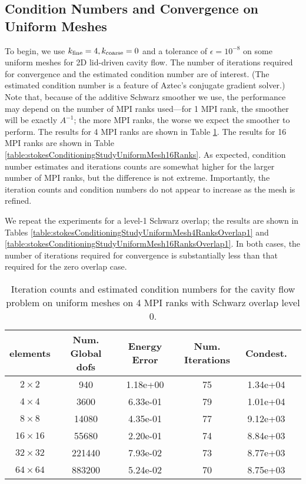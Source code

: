 \documentclass[11pt]{amsart}
\begin{document}
\subsection{Condition Numbers and Convergence on Uniform Meshes}
\label{sec:convergenceStokesUniformMeshes}
To begin, we use $k_{\rm fine} = 4, k_{\rm coarse} = 0$ and a tolerance of $\epsilon = 10^{-8}$ on some uniform meshes for 2D lid-driven cavity flow.  The number of iterations required for convergence and the estimated condition number are of interest.  (The estimated condition number is a feature of Aztec's conjugate gradient solver.)  Note that, because of the additive Schwarz smoother we use, the performance may depend on the number of MPI ranks used---for 1 MPI rank, the smoother will be exactly $A^{-1}$; the more MPI ranks, the worse we expect the smoother to perform.  The results for 4 MPI ranks are shown in Table \ref{table:stokesConditioningStudyUniformMesh4Ranks}.  The results for 16 MPI ranks are shown in Table \ref{table:stokesConditioningStudyUniformMesh16Ranks}.  As expected, condition number estimates and iterations counts are somewhat higher for the larger number of MPI ranks, but the difference is not extreme.  Importantly, the iteration counts and condition numbers do not appear to increase as the mesh is refined.

We repeat the experiments for a level-1 Schwarz overlap; the results are shown in Tables \ref{table:stokesConditioningStudyUniformMesh4RanksOverlap1} and \ref{table:stokesConditioningStudyUniformMesh16RanksOverlap1}.  In both cases, the number of iterations required for convergence is substantially less than that required for the zero overlap case.

\begin{table}
\begin{tabular}{ c  c  c  c  c  c }
elements	& Num. Global dofs	&Energy Error	&Num. Iterations	&Condest.		\\
\hline
$2 \times 2$	&940		&1.18e+00	&75	&1.34e+04\\
$4 \times 4$	&3600		&6.33e-01		&79	&1.01e+04\\
$8 \times 8$	&14080		&4.35e-01		&77	&9.12e+03\\
$16 \times 16$	&55680		&2.20e-01		&74	&8.84e+03\\
$32 \times 32$	&221440		&7.93e-02		&73	&8.77e+03\\
$64 \times 64$	&883200		&5.24e-02		&70	& 8.75e+03\\
\end{tabular}
\caption{Iteration counts and estimated condition numbers for the cavity flow problem on uniform meshes on 4 MPI ranks with Schwarz overlap level 0.}
\label{table:stokesConditioningStudyUniformMesh4Ranks}
\end{table}
\end{document}
